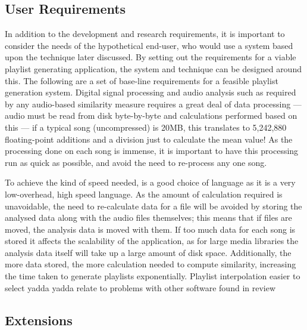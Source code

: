 \subsection{User Requirements}
In addition to the development and research requirements, it is important to consider the needs of the hypothetical end-user, who would use a system based upon the technique later discussed. By setting out the requirements for a viable playlist generating application, the system and technique can be designed around this. The following are a set of base-line requirements for a feasible playlist generation system.
Digital signal processing and audio analysis such as required by any audio-based similarity measure requires a great deal of data processing --- audio must be read from disk byte-by-byte and calculations performed based on this --- if a typical song (uncompressed) is 20MB, this translates to 5,242,880 floating-point additions and a division just to calculate the mean value! As the processing done on each song is immense, it is important to have this processing run as quick as possible, and avoid the need to re-process any one song.

To achieve the kind of speed needed,  is a good choice of language as it is a very low-overhead, high speed language. As the amount of calculation required is unavoidable, the need to re-calculate data for a file will be avoided by storing the analysed data along with the audio files themselves; this means that if files are moved, the analysis data is moved with them.
\label{text:spec:requirement:data}
If too much data for each song is stored it affects the scalability of the application, as for large media libraries the analysis data itself will take up a large amount of disk space. Additionally, the more data stored, the more calculation needed to compute similarity, increasing the time taken to generate playlists exponentially.
Playlist interpolation easier to select yadda yadda 
relate to problems with other software found in review
\subsection{Extensions}

